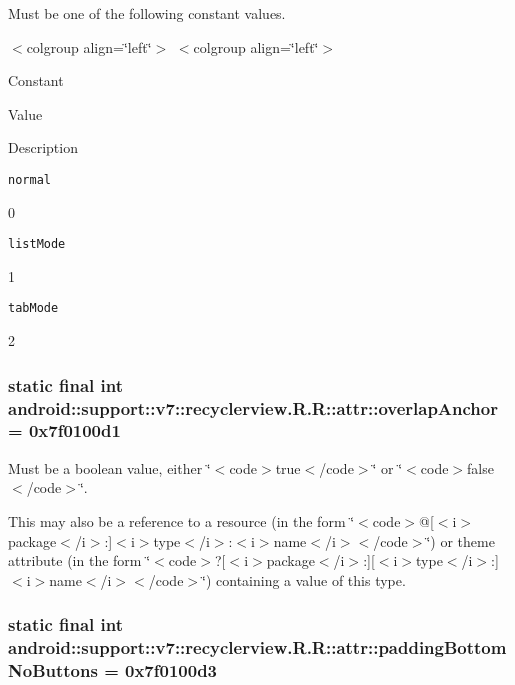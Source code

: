 Must be one of the following constant values. \begin{TabularC}{0}
\hline
\end{TabularC}
$<$colgroup align=\char`\"{}left\char`\"{}$>$ $<$colgroup align=\char`\"{}left\char`\"{}$>$ 

Constant

Value

Description 

{\tt normal}

0

{\tt listMode}

1

{\tt tabMode}

2\hypertarget{classandroid_1_1support_1_1v7_1_1recyclerview_1_1_r_1_1attr_94c14ecd71a07909ea87dc7735d62f26}{
\subsubsection[{overlapAnchor}]{\setlength{\rightskip}{0pt plus 5cm}static final int android::support::v7::recyclerview.R.R::attr::overlapAnchor = 0x7f0100d1}}
\label{classandroid_1_1support_1_1v7_1_1recyclerview_1_1_r_1_1attr_94c14ecd71a07909ea87dc7735d62f26}


Must be a boolean value, either \char`\"{}$<$code$>$true$<$/code$>$\char`\"{} or \char`\"{}$<$code$>$false$<$/code$>$\char`\"{}. 

This may also be a reference to a resource (in the form \char`\"{}$<$code$>$@\mbox{[}$<$i$>$package$<$/i$>$:\mbox{]}$<$i$>$type$<$/i$>$:$<$i$>$name$<$/i$>$$<$/code$>$\char`\"{}) or theme attribute (in the form \char`\"{}$<$code$>$?\mbox{[}$<$i$>$package$<$/i$>$:\mbox{]}\mbox{[}$<$i$>$type$<$/i$>$:\mbox{]}$<$i$>$name$<$/i$>$$<$/code$>$\char`\"{}) containing a value of this type. \hypertarget{classandroid_1_1support_1_1v7_1_1recyclerview_1_1_r_1_1attr_316d278b88f90976c94cda117d65a77d}{
\subsubsection[{paddingBottomNoButtons}]{\setlength{\rightskip}{0pt plus 5cm}static final int android::support::v7::recyclerview.R.R::attr::paddingBottomNoButtons = 0x7f0100d3}}
\label{classandroid_1_1support_1_1v7_1_1recyclerview_1_1_r_1_1attr_316d278b88f90976c94cda117d65a77d}


